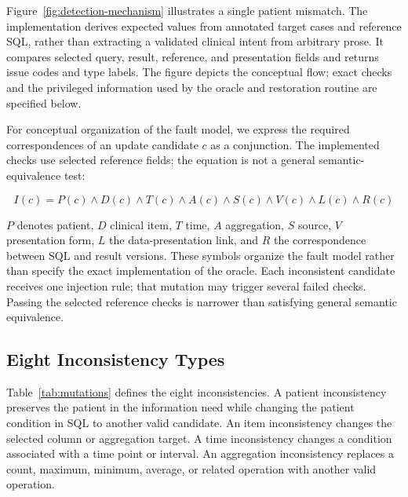 \documentclass[manuscript,review,anonymous]{acmart}
\begin{document}
Figure~\ref{fig:detection-mechanism} illustrates a single patient mismatch. The implementation derives expected values from annotated target cases and reference SQL, rather than extracting a validated clinical intent from arbitrary prose. It compares selected query, result, reference, and presentation fields and returns issue codes and type labels. The figure depicts the conceptual flow; exact checks and the privileged information used by the oracle and restoration routine are specified below.

For conceptual organization of the fault model, we express the required correspondences of an update candidate $c$ as a conjunction. The implemented checks use selected reference fields; the equation is not a general semantic-equivalence test:

\begin{equation}
I(c)=P(c)\land D(c)\land T(c)\land A(c)\land S(c)\land V(c)\land L(c)\land R(c)
\end{equation}

$P$ denotes patient, $D$ clinical item, $T$ time, $A$ aggregation, $S$ source, $V$ presentation form, $L$ the data-presentation link, and $R$ the correspondence between SQL and result versions. These symbols organize the fault model rather than specify the exact implementation of the oracle. Each inconsistent candidate receives one injection rule; that mutation may trigger several failed checks. Passing the selected reference checks is narrower than satisfying general semantic equivalence.

\subsection{Eight Inconsistency Types}

Table~\ref{tab:mutations} defines the eight inconsistencies. A patient inconsistency preserves the patient in the information need while changing the patient condition in SQL to another valid candidate. An item inconsistency changes the selected column or aggregation target. A time inconsistency changes a condition associated with a time point or interval. An aggregation inconsistency replaces a count, maximum, minimum, average, or related operation with another valid operation.
\end{document}
